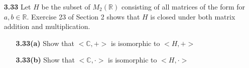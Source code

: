 \documentclass[11pt]{article}
\theoremstyle{plain}
\theoremstyle{definition}
\newcommand{\C}{\mathbb{C}}
\newcommand{\R}{\mathbb{R}}
\begin{document}
\begin{enumerate}
\begin{enumerate}
        \item[\textbf{3.33}] Let $H$ be the subset of $M_2(\R)$ consisting of all matrices of the form for $a,b \in \R$. Exercise 23 of Section 2 shows that $H$ is closed under both matrix addition and multiplication.
        
        \begin{enumerate}
            \item[\textbf{3.33(a)}] Show that $<\C,+>$ is isomorphic to $<H,+>$ 
            \item[\textbf{3.33(b)}] Show that $<\C,\cdot>$ is isomorphic to $<H,\cdot>$
        \end{enumerate}
    \end{enumerate}
  

\end{enumerate}
\end{document}
